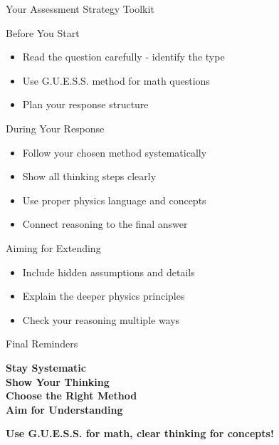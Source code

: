 \documentclass{beamer}
\begin{document}
\begin{frame}{Your Assessment Strategy Toolkit}
\begin{block}{Before You Start}
\begin{itemize}
\item Read the question carefully - identify the type \pause
\item Use G.U.E.S.S. method for math questions \pause
\item Plan your response structure
\end{itemize}
\end{block}

\pause
\begin{block}{During Your Response}
\begin{itemize}
\item Follow your chosen method systematically \pause
\item Show all thinking steps clearly \pause
\item Use proper physics language and concepts \pause
\item Connect reasoning to the final answer
\end{itemize}
\end{block}

\pause
\begin{block}{Aiming for Extending}
\begin{itemize}
\item Include hidden assumptions and details \pause
\item Explain the deeper physics principles \pause
\item Check your reasoning multiple ways
\end{itemize}
\end{block}
\end{frame}

\begin{frame}{Final Reminders}
\begin{center}
\Large
\textcolor{ds9blue}{\textbf{Stay Systematic}} \\
\vspace{0.3cm}
\textcolor{ds9gold}{\textbf{Show Your Thinking}} \\
\vspace{0.3cm}
\textcolor{ds9blue}{\textbf{Choose the Right Method}} \\
\vspace{0.3cm}
\textcolor{ds9red}{\textbf{Aim for Understanding}} \\
\end{center}

\vspace{1cm}

\begin{center}
\textbf{Use G.U.E.S.S. for math, clear thinking for concepts!}
\end{center}
\end{frame}
\end{document}
